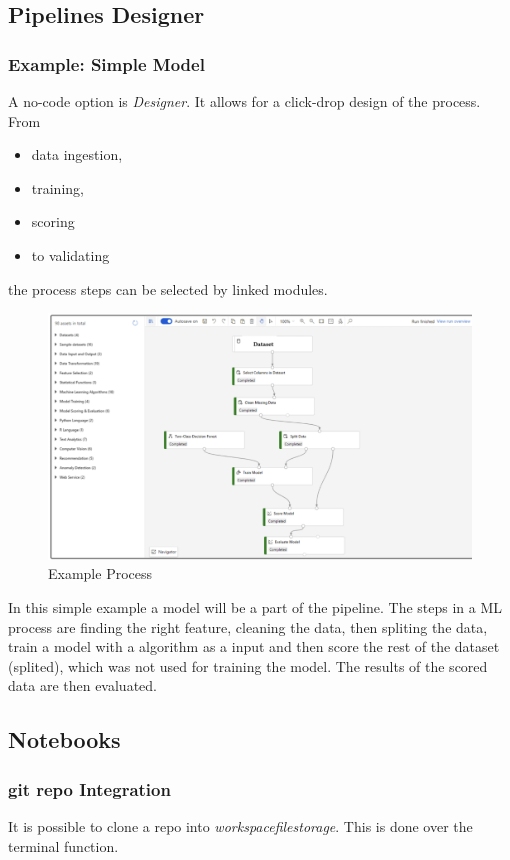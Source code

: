 \subsection{Pipelines Designer}
\subsubsection{Example: Simple Model}
A no-code option is \textit{Designer}. It allows for a click-drop design of the process. From 
\begin{itemize}
	\item data ingestion,
	\item training,
	\item scoring
	\item to validating
\end{itemize}
the process steps can be selected by linked modules.

\begin{figure}[H]
	\centering
	\includegraphics[scale = 0.3]{attachment/chapter_10/Scc005}
	\caption{Example Process}
\end{figure}

In this simple example a model will be a part of the pipeline. The steps in a \gls{ML} process are finding the right feature, cleaning the data, then spliting the data, train a model with a algorithm as a input and then score the rest of the dataset (splited), which was not used for training the model. The results of the scored data are then evaluated.


\subsection{Notebooks}
\subsubsection{git repo Integration} \label{subsub:git_repo}
It is possible to clone a repo into \textit{workspacefilestorage}. This is done over the terminal function.

